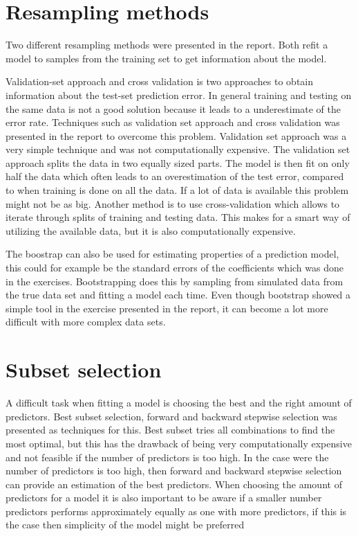 \section{Resampling methods}
Two different resampling methods were presented in the report. Both refit a model to samples from the training set to get information about the model. 

Validation-set approach and cross validation is two approaches to obtain information about the test-set prediction error. In general training and testing on the same data is not a good solution because it leads to a underestimate of the error rate. Techniques such as validation set approach and cross validation was presented in the report to overcome this problem. Validation set approach was a very simple technique and was not computationally expensive. The validation set approach splits the data in two equally sized parts. The model is then fit on only half the data which often leads to an overestimation of the test error, compared to when training is done on all the data. If a lot of data is available this problem might not be as big. Another method is to use cross-validation which allows to iterate through splits of training and testing data. This makes for a smart way of utilizing the available data, but it is also computationally expensive.

The boostrap can also be used for estimating properties of a prediction model, this could for example be the standard errors of the coefficients which was done in the exercises. Bootstrapping does this by sampling from simulated data from the true data set and fitting a model each time. Even though bootstrap showed a simple tool in the exercise presented in the report, it can become a lot more difficult with more complex data sets.

\section{Subset selection}
A difficult task when fitting a model is choosing the best and the right amount of predictors. Best subset selection, forward and backward stepwise selection was presented as techniques for this. Best subset tries all combinations to find the most optimal, but this has the drawback of being very computationally expensive and not feasible if the number of predictors is too high. In the case were the number of predictors is too high, then forward and backward stepwise selection can provide an estimation of the best predictors. When choosing the amount of predictors for a model it is also important to be aware if a smaller number predictors performs approximately equally as one with more predictors, if this is the case then simplicity of the model might be preferred

